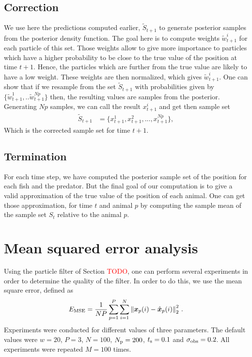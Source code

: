\documentclass[final]{aomart}
\newtheorem[{}\it]{thm}{Theorem}[section]
\theoremstyle{definition}
\newtheorem*[{}\it]{notation}{Notation}
\numberwithin{equation}{section}
\newcommand{\ts}{t_\textnormal{s}}
\newcommand{\np}{N_\textnormal{p}}
\newcommand{\enVert}[1]{\left\lVert#1\right\rVert}
\let\norm=\enVert
\begin{document}
 \subsection{Correction}
 We use here the predictions computed earlier, \(\tilde{S}_{t+1}\) to generate posterior samples from the posterior density function. The goal here is to compute weights \( \tilde{w}_{t+1}^i \) for each particle of this set. Those weights allow to give more importance to particles which have a higher probability to be close to the true value of the position at time \(t+1\). Hence, the particles which are further from the true value are likely to have a low weight. These weights are then normalized, which gives \( \tilde{w}_{t+1}^i \). One can show that if we resample from the set \(\tilde{S}_{t+1}\) with probabilities given by \( \{ \tilde{w}_{t+1}^1,..\tilde{w}_{t+1}^{Np} \} \) then, the resulting values are samples from the posterior. Generating \(Np\) samples, we can call the result \( x_{t+1}^i \) and get then sample set
 \begin{align}
 	\tilde{S}_{t+1} & = \{ x_{t+1}^1, x_{t+1}^2,...,x_{t+1}^{Np} \},
 \end{align}
 Which is the corrected sample set for time \( t+1 \).
 \subsection{Termination}
 For each time step, we have computed the posterior sample set of the position for each fish and the predator. But the final goal of our computation is to give a valid approximation of the true value of the position of each animal. One can get those approximation, for time \(t\) and animal \(p\) by computing the sample mean of the sample set \(S_{t}\) relative to the animal \(p\).
 
 \section{Mean squared error analysis}
 Using the particle filter of Section \textcolor{red}{TODO}, one can perform several experiments in order to determine the quality of the filter.
 In order to do this, we use the mean square error, defined as
 \begin{align}
 E_{\textnormal{MSE}} = \frac{1}{NP} \sum_{p=1}^P \sum_{i=1}^N \norm{\bm{x}_p(i) - \hat{\bm{x}}_p(i)}_{2}^2\,.
 \end{align}
 Experiments were conducted for different values of three parameters.
 The default values were \(w = 20\), \(P = 3\), \(N = 100\),  \(\np = 200\), \(\ts = 0.1\) and \(\sigma_{\textnormal{obs}} = 0.2\).
 All experiments were repeated \(M = 100\) times.
 
\end{document}
